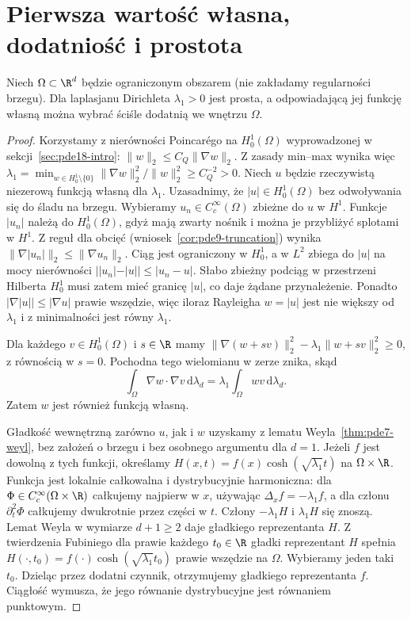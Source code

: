 \section{Pierwsza wartość własna, dodatniość i prostota}
\label{sec:pde18-ground}
\begin{twierdzenie}
\label{thm:pde18-simple}
Niech $\Omega\subset\R^d$ będzie ograniczonym obszarem
(nie zakładamy regularności brzegu). Dla laplasjanu Dirichleta
$\lambda_1>0$ jest prosta, a odpowiadającą jej funkcję
własną można wybrać ściśle dodatnią we wnętrzu $\Omega$.
\end{twierdzenie}
\begin{proof}
Korzystamy z nierówności Poincarégo na $H_0^1(\Omega)$
wyprowadzonej w sekcji~\ref{sec:pde18-intro}:
$\|w\|_2\le C_Q\|\nabla w\|_2$.
Z zasady min--max wynika więc
$\lambda_1=\min_{w\in H_0^1\setminus\{0\}}
\|\nabla w\|_2^2/\|w\|_2^2\ge C_Q^{-2}>0$.
Niech $u$ będzie rzeczywistą niezerową funkcją własną
dla $\lambda_1$. Uzasadnimy, że $|u|\in H_0^1(\Omega)$
bez odwoływania się do śladu na brzegu.
Wybieramy $u_n\in C_c^\infty(\Omega)$ zbieżne do $u$
w $H^1$. Funkcje $|u_n|$ należą do $H_0^1(\Omega)$,
gdyż mają zwarty nośnik i można je przybliżyć splotami
w $H^1$. Z reguł dla obcięć (wniosek~\ref{cor:pde9-truncation})
wynika $\|\nabla|u_n|\|_2\le\|\nabla u_n\|_2$.
Ciąg jest ograniczony w $H_0^1$, a w $L^2$ zbiega
do $|u|$ na mocy nierówności
$||u_n|-|u||\le|u_n-u|$. Słabo zbieżny podciąg
w przestrzeni Hilberta $H_0^1$ musi zatem mieć
granicę $|u|$, co daje żądane przynależenie.
Ponadto $|\nabla|u||\le|\nabla u|$ prawie wszędzie,
więc iloraz Rayleigha $w=|u|$ jest nie większy od
$\lambda_1$ i z minimalności jest równy $\lambda_1$.

Dla każdego $v\in H_0^1(\Omega)$ i $s\in\R$ mamy
$\|\nabla(w+sv)\|_2^2-\lambda_1\|w+sv\|_2^2\ge0$,
z równością w $s=0$. Pochodna tego wielomianu
w zerze znika, skąd
\[
 \int_\Omega\nabla w\cdot\nabla v\,\mathrm d\lambda_d
 =\lambda_1\int_\Omega wv\,\mathrm d\lambda_d.
\]
Zatem $w$ jest również funkcją własną.

Gładkość wewnętrzną zarówno $u$, jak i $w$ uzyskamy
z lematu Weyla~\ref{thm:pde7-weyl}, bez założeń o brzegu
i bez osobnego argumentu dla $d=1$.
Jeżeli $f$ jest dowolną z tych funkcji, określamy
$H(x,t)=f(x)\cosh(\sqrt{\lambda_1}t)$ na
$\Omega\times\R$. Funkcja jest lokalnie całkowalna
i dystrybucyjnie harmoniczna:
dla $\Phi\in C_c^\infty(\Omega\times\R)$ całkujemy
najpierw w $x$, używając
$\Delta_x f=-\lambda_1 f$, a dla członu
$\partial_t^2\Phi$ całkujemy dwukrotnie przez części w $t$.
Człony $-\lambda_1H$ i $\lambda_1H$ się znoszą.
Lemat Weyla w wymiarze $d+1\ge2$ daje gładkiego
reprezentanta $H$. Z twierdzenia Fubiniego dla prawie każdego $t_0\in\R$
gładki reprezentant $H$ spełnia
$H(\cdot,t_0)=f(\cdot)\cosh(\sqrt{\lambda_1}t_0)$
prawie wszędzie na $\Omega$. Wybieramy jeden taki $t_0$. Dzieląc przez dodatni czynnik,
otrzymujemy gładkiego reprezentanta $f$.
Ciągłość wymusza, że jego równanie dystrybucyjne
jest równaniem punktowym.


\end{proof}
